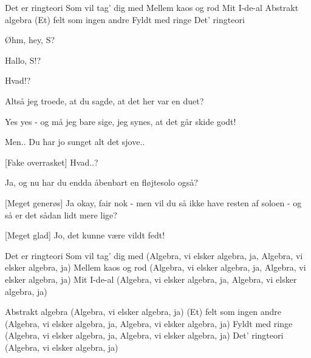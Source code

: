 \documentclass[a4paper,11pt]{article}
\begin{document}
\begin{song}
%
Det er ringteori
Som vil tag' dig med
Mellem kaos og rod
Mit I-de-al
Abstrakt algebra
(Et) felt som ingen andre
Fyldt med ringe
Det' ringteori


%
Øhm, hey, S?


%
Hallo, S!?

%
Hvad!?


%
Altså jeg troede, at du sagde, at det her var en duet?

%
Yes yes - og må jeg bare sige, jeg synes, at det går skide godt!

%
Men.. Du har jo sunget alt det sjove..

%
[Fake overrasket] Hvad..? 

%
Ja, og nu har du endda åbenbart en fløjtesolo også?

[Meget generøs] Ja okay, fair nok - men vil du så ikke have resten af soloen - og så er det sådan lidt mere lige?

%
[Meget glad] Jo, det kunne være vildt fedt!



%
Det er ringteori
Som vil tag' dig med 
(Algebra, vi elsker algebra, ja, Algebra, vi elsker algebra, ja)
Mellem kaos og rod 
(Algebra, vi elsker algebra, ja, Algebra, vi elsker algebra, ja)
Mit I-de-al 
(Algebra, vi elsker algebra, ja, Algebra, vi elsker algebra, ja)


%
Abstrakt algebra 
(Algebra, vi elsker algebra, ja)
(Et) felt som ingen andre 
(Algebra, vi elsker algebra, ja, Algebra, vi elsker algebra, ja)
Fyldt med ringe 
(Algebra, vi elsker algebra, ja, Algebra, vi elsker algebra, ja)
Det' ringteori 
(Algebra, vi elsker algebra, ja)


\end{song}
\end{document}
